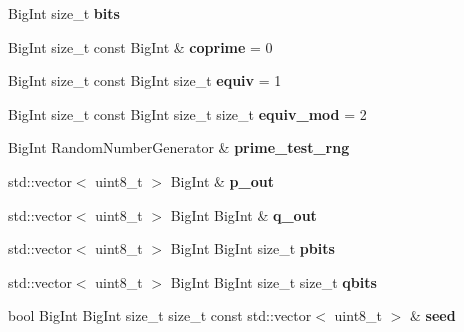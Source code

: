 \begin{DoxyCompactItemize}
\item 
\mbox{\label{namespace_botan_acbf847dcf710005795c5bd18dd0c7f3e}} 
Big\+Int size\+\_\+t {\bfseries bits}
\item 
\mbox{\label{namespace_botan_a24cffeb851548753b89d8acdbe2e94ce}} 
Big\+Int size\+\_\+t const Big\+Int \& {\bfseries coprime} = 0
\item 
\mbox{\label{namespace_botan_a52d098906ac2dd3d1b710dda88847fb7}} 
Big\+Int size\+\_\+t const Big\+Int size\+\_\+t {\bfseries equiv} = 1
\item 
\mbox{\label{namespace_botan_a6e9db11f09f6c81a2a5036c7abf7b1c7}} 
Big\+Int size\+\_\+t const Big\+Int size\+\_\+t size\+\_\+t {\bfseries equiv\+\_\+mod} = 2
\item 
\mbox{\label{namespace_botan_a750e5deb1352837f132e0e4cee75db5b}} 
Big\+Int Random\+Number\+Generator \& {\bfseries prime\+\_\+test\+\_\+rng}
\item 
\mbox{\label{namespace_botan_ab98504c631d16037948bac63e5cdfe09}} 
std\+::vector$<$ uint8\+\_\+t $>$ Big\+Int \& {\bfseries p\+\_\+out}
\item 
\mbox{\label{namespace_botan_acf8778d0ff7f1f50c83144de7a872895}} 
std\+::vector$<$ uint8\+\_\+t $>$ Big\+Int Big\+Int \& {\bfseries q\+\_\+out}
\item 
\mbox{\label{namespace_botan_a75b7dded45bbf408f71819bdaa0c092a}} 
std\+::vector$<$ uint8\+\_\+t $>$ Big\+Int Big\+Int size\+\_\+t {\bfseries pbits}
\item 
\mbox{\label{namespace_botan_a04a0ad7c77e33d4803b40b472f2f247b}} 
std\+::vector$<$ uint8\+\_\+t $>$ Big\+Int Big\+Int size\+\_\+t size\+\_\+t {\bfseries qbits}
\item 
\mbox{\label{namespace_botan_aaa938ba4faf7be07fadef6e3e4c8e1cf}} 
bool Big\+Int Big\+Int size\+\_\+t size\+\_\+t const std\+::vector$<$ uint8\+\_\+t $>$ \& {\bfseries seed}
\item 
\mbox{\label{namespace_botan_aa2f78391f7196dabe4675829b8add034}} 

\end{DoxyCompactItemize}
